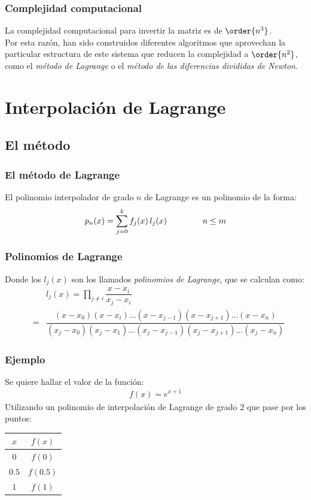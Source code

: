\begin{frame}
\frametitle{Complejidad computacional}
La complejidad computacional para invertir la matriz es de $\order{n^{3}}$.
\\
\bigskip
\pause
Por esta razón, han sido construidos diferentes algoritmos que aprovechan la particular estructura de este sistema que reducen la complejidad a $\order{n^{2}}$, como el \emph{método de Lagrange} o el \emph{método de las diferencias divididas de Newton}.
\end{frame}
\section{Interpolación de Lagrange}
\subsection{El método}
\begin{frame}
\frametitle{El método de Lagrange}
El polinomio interpolador de grado $n$ de Lagrange es un polinomio de la forma:
\begin{align*}
p_{n}(x) = \sum_{j=0}^{k} f_{j}(x) \, l_{j}(x) \hspace{1.5cm} n \leq m
\end{align*}
\end{frame}
\begin{frame}
\frametitle{Polinomios de Lagrange}
Donde los $l_{j}(x)$ son los llamados \emph{polinomios de Lagrange}, que se calculan como:
\fontsize{12}{12}\selectfont
\begin{eqnarray*}
&{}&l_{j}(x) = \prod_{j \neq i} \dfrac{x - x_{i}}{x_{j} - x_{i}} \\[0.5em]
&=& \dfrac{(x - x_{0})(x - x_{i}) \ldots(x - x_{j-1})(x - x_{j+1}) \ldots (x - x_{n})}{(x_{j} - x_{0})(x_{j} - x_{1}) \ldots(x_{j} - x_{j-1})(x_{j} - x_{j+1}) \ldots (x_{j} - x_{n})}
\end{eqnarray*}
\end{frame}
\begin{frame}
\frametitle{Ejemplo}
Se quiere hallar el valor de la función:
\begin{align*}
f(x) = e^{x+1}
\end{align*}
Utilizando un polinomio de interpolación de Lagrange de grado $2$ que pase por los puntos:
\pause
\fontsize{12}{12}\selectfont
\begin{table}
\centering
\begin{tabular}{c | c}
$x$ & $f(x)$ \\ \hline
$0$ & $f(0)$ \\
$0.5$ & $f(0.5)$ \\
$1$ & $f(1)$ \\
\end{tabular}
\end{table}
\end{frame}
